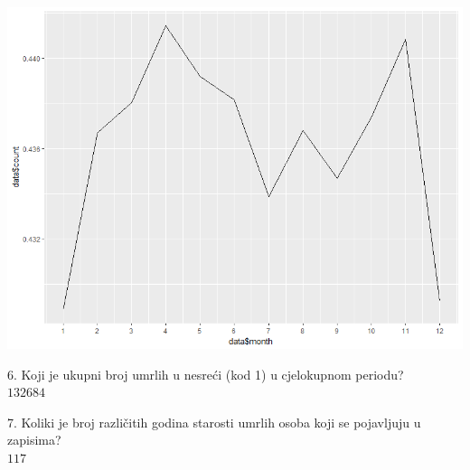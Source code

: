 \documentclass[paper=a4, fontsize=11pt]{scrartcl}
\numberwithin{equation}{section}		%
\numberwithin{figure}{section}			%
\numberwithin{table}{section}				%
\begin{document}
\includegraphics[width=\textwidth]{marriedDeadMales.png}

6. Koji je ukupni broj umrlih u nesreći (kod 1) u cjelokupnom periodu?\\
$132684$

7. Koliki je broj različitih godina starosti umrlih osoba koji se pojavljuju u zapisima?\\
$117$

\pagebreak
\end{document}

